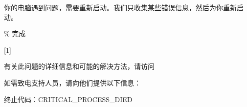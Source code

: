 \documentclass{article}
\newcommand\TEXTA[1]{\begingroup\fontsize{180}{180}\selectfont#1\endgroup}
\newcommand\TEXTB[1]{\begingroup\fontsize{24}{24}\selectfont#1\endgroup}
\newcommand\TEXTC[1]{\begingroup\fontsize{12.5}{12.5}\selectfont#1\endgroup}
\newcommand\TEXTD[1]{\begingroup\fontsize{10.5}{10.5}\selectfont#1\endgroup}
\begin{document}
\pagestyle{empty}
\pagecolor[HTML]{\BGCOLOR}
\color{white}

\vspace*{30pt}

\TEXTA{\EMOJI}

\vspace{30pt}

\TEXTB{你的电脑遇到问题，需要重新启动。我们只收集某些错误信息，然后为你重新启动。}

\vspace{30pt}

\TEXTB{\PERCENT\% 完成}

\vspace{30pt}

\begin{varwidth}[t]{\textwidth}
  \vspace{0pt}
  \setlength{\fboxsep}{8pt}
  \scalebox{0.75}[1]{%
    \colorbox{white}{%
      \color[HTML]{\BGCOLOR}%
      \qrcode[level=L,height=75pt]{\LINK}}}
\end{varwidth}
\hspace{10pt}
\begin{varwidth}[t]{\textwidth}
  \vspace{0pt}
  \TEXTC{有关此问题的详细信息和可能的解决方法，请访问~~\LINK}

  \vspace{25pt}

  \TEXTD{如需致电支持人员，请向他们提供以下信息：}

  \vspace{6pt}

  \TEXTD{终止代码：CRITICAL\_PROCESS\_DIED}
\end{varwidth}
\end{document}

